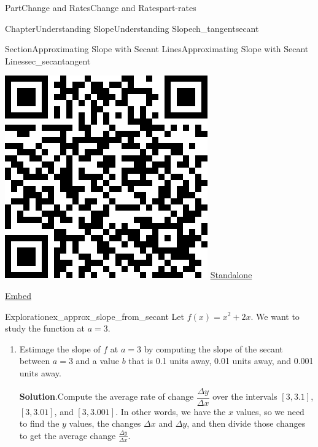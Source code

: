 \documentclass[oneside,10pt,]{tufte-book}
\newcommand{\blocktitlefont}{\relax}
\numberwithin{equation}{chapter}
\begin{document}
\begin{partptx}{Part}{Change and Rates}{}{Change and Rates}{}{}{part-rates}
\begin{chapterptx}{Chapter}{Understanding Slope}{}{Understanding Slope}{}{}{ch_tangentsecant}
\begin{sectionptx}{Section}{Approximating Slope with Secant Lines}{}{Approximating Slope with Secant Lines}{}{}{sec_secantangent}
\begin{sidebyside}{2}{0.075}{0.075}{0.17}
\begin{sbspanel}{0.21}
\includegraphics[width=\linewidth]{generated/qrcode/sec_secantangent-5.png}
\href{http://webwork.bridgew.edu/oer/functions_at_work/sec_secantangent-5.html}{Standalone}%
\par
\href{http://webwork.bridgew.edu/oer/functions_at_work/sec_secantangent-5-if.html}{Embed}%
\end{sbspanel}%
\end{sidebyside}%
\begin{exploration}{Exploration}{}{ex_approx_slope_from_secant}%
Let \(f(x) = x^2 + 2x\).  We want to study the function at \(a=3\).%
\begin{enumerate}[font=\bfseries,label=(\alph*),ref=\alph*]%
\item{}Estimage the slope of \(f\) at \(a=3\) by computing the slope of the secant between \(a=3\) and a value \(b\) that is 0.1 units away, 0.01 units away, and 0.001 units away.%
\par\smallskip%
\noindent\textbf{\blocktitlefont Solution}.\hypertarget{ex_approx_slope_from_secant-2-2}{}\quad{}Compute the average rate of change \(\dfrac{\Delta y}{\Delta x}\) over the intervals \([3,3.1]\), \([3,3.01]\), and \([3,3.001]\). In other words, we have the \(x\) values, so we need to find the \(y\) values, the changes \(\Delta x\) and \(\Delta y\), and then divide those changes to get the average change \(\frac{\Delta y}{\Delta x}\).%

\end{enumerate}
\end{exploration}
\end{sectionptx}
\end{chapterptx}
\end{partptx}
\end{document}
